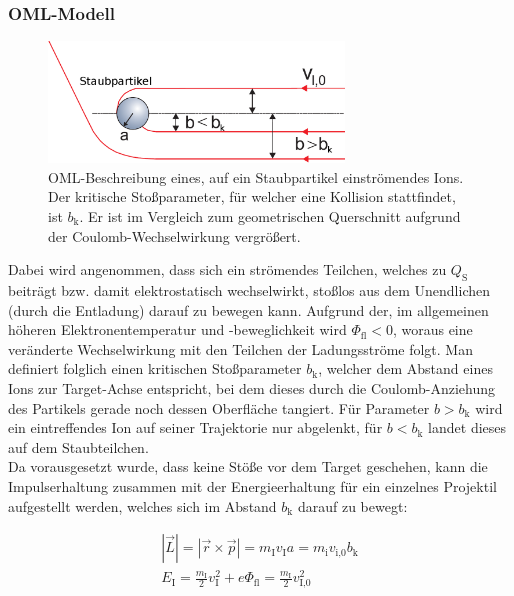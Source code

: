 \documentclass[numbers=noenddot,a4paper]{scrartcl}
\newcommand{\ix}[1]{_\text{#1}}
\begin{document}
		\subsubsection{OML-Modell}\label{subsub:oml}
					
					\begin{figure}
						\centering
						\includegraphics[width=0.7\textwidth, height=0.3\textwidth]{figs/orbitalmotionlimitmelzer.png}
						\caption{OML-Beschreibung eines, auf ein Staubpartikel einströmendes Ions. Der kritische Stoßparameter, für welcher eine Kollision stattfindet, ist $b\ix{k}$. Er ist im Vergleich zum geometrischen Querschnitt aufgrund der Coulomb-Wechselwirkung vergrößert.}
						\label{img:oml}
					\end{figure}
			
		Dabei wird angenommen, dass sich ein strömendes Teilchen, welches zu $Q\ix{S}$ beiträgt bzw. damit elektrostatisch wechselwirkt, stoßlos aus dem Unendlichen (durch die Entladung) darauf zu bewegen kann. Aufgrund der, im allgemeinen höheren Elektronentemperatur und -beweglichkeit wird $\Phi\ix{fl}<0$, woraus eine veränderte Wechselwirkung mit den Teilchen der Ladungsströme folgt. Man definiert folglich einen kritischen Stoßparameter $b\ix{k}$, welcher dem Abstand eines Ions zur Target-Achse entspricht, bei dem dieses durch die Coulomb-Anziehung des Partikels gerade noch dessen Oberfläche tangiert. Für Parameter $b>b\ix{k}$ wird ein eintreffendes Ion auf seiner Trajektorie nur abgelenkt, für $b<b\ix{k}$ landet dieses auf dem Staubteilchen.\\
		Da vorausgesetzt wurde, dass keine Stöße vor dem Target geschehen, kann die Impulserhaltung zusammen mit der Energieerhaltung für ein einzelnes Projektil aufgestellt werden, welches sich im Abstand $b\ix{k}$ darauf zu bewegt:
		
			\begin{align}
				|\vec{L}|=|\vec{r}\times\vec{p}|=m\ix{I}v\ix{I}a=m\ix{i}v\ix{i,0}b\ix{k} \label{eq:impulserhaltung} \\
				E\ix{I}=\frac{m\ix{I}}{2}v\ix{I}^2+e\Phi\ix{fl}=\frac{m\ix{I}}{2}v\ix{I,0}^2 \label{eq:energieerhaltung}
			\end{align}
			
\end{document}
